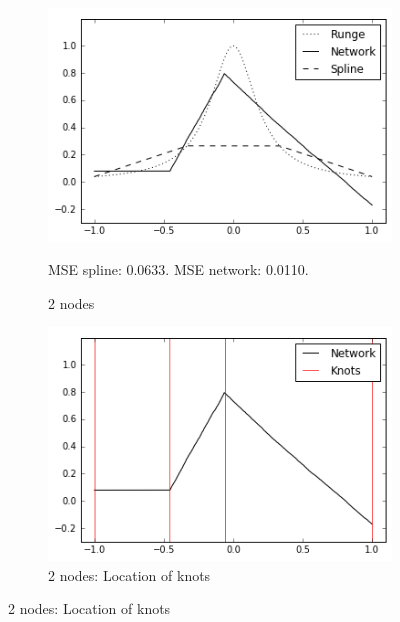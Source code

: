 \documentclass[11pt, letterpaper]{amsart}
\begin{document}
\begin{figure}[H]
    \centering
    \begin{subfigure}{.45\textwidth}
        \includegraphics[width=\textwidth]{2nodes1.png}
        \caption{2 nodes}
        	\begin{tablenotes}
                 \tiny
            	\item  MSE spline: 0.0633. MSE network: 0.0110.
        	\end{tablenotes}
    \end{subfigure}
    \quad
    \begin{subfigure}{.45\textwidth}
        \includegraphics[width=\textwidth]{2nodes2.png}
        \caption{2 nodes: Location of knots}
    \end{subfigure}
    

\end{figure}
\end{document}
